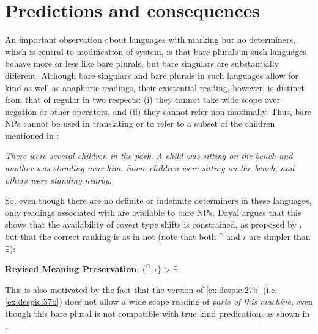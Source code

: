 \documentclass[output=paper,
modfonts
]{langscibook}
\begin{document}
	\section{Predictions and consequences}  \label{sec:despic:4}\largerpage[-1]
	
	An important observation about languages with  marking but no determiners, which is
	central to  modification of  system, is that bare plurals in such languages behave more or less like  bare plurals, but bare singulars are substantially different. Although bare singulars and bare plurals in such languages allow for kind as well as anaphoric readings, their existential reading, however, is distinct from that of regular 
	in two respects: (i) they cannot take wide scope over negation or other operators, and (ii) they cannot refer non-maximally. Thus, bare NPs cannot be used in translating  or  to refer
	to a subset of the children mentioned in  \citep[1100]{Dayal2011}:
	
	\ea \label{ex:despic:35}
	\ea \label{ex:despic:35a}
	\textit{There were several children in the park.}
	\ex \label{ex:despic:35b}
	\textit{A child was sitting on the bench and another was standing near him.}
	\ex \label{ex:despic:35c}
	\textit{Some children were sitting on the bench, and others were standing nearby.} 
	\z 
	\z 
	
	So, even though there are no definite or indefinite determiners in these languages, only readings associated with  are available to bare NPs. Dayal argues that this shows that the availability of covert type shifts is constrained, as proposed by \citet{Chierchia1998}, but that the correct ranking is as in  not  (note that both $^\cap$ and $\iota$ are simpler than $\exists$):
	
	\ea \label{ex:despic:36}
	\textbf{Revised Meaning Preservation}: $\{^\cap,\iota\}>\exists$ \citep[219]{Dayal2004} 
	\z 
	
	This is also motivated by the fact that the  version of \ref{ex:despic:27b} (i.e. \ref{ex:despic:37b}) does not allow a
	wide scope reading of \textit{parts of this machine}, even though this bare plural is not compatible with true kind predication, as shown in .
	
\end{document}
